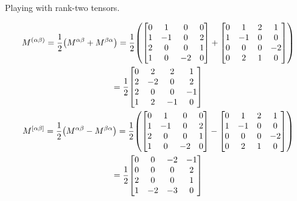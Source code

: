 \documentclass{report}
\begin{document}
\begin{subquests}
\begin{subquests}
		\item	
	\end{subquests}

	\item {Playing with rank-two tensors.}
	\begin{subquests}
		\item
		\begin{subquests}
			\item
			\begin{gather*}
				M^{\pqty{\alpha \beta}} = \frac{1}{2}\pqty{M^{\alpha \beta} + M^{\beta \alpha}} = \frac{1}{2} \pqty{
				\mqty[
					0 & 1 & 0 & 0 \\
					1 & -1 & 0 & 2 \\
					2 & 0 & 0 & 1 \\
					1 & 0 & -2 & 0
				]
				+
				\mqty[
					0 & 1 & 2 & 1 \\
					1 & -1 & 0 & 0 \\
					0 & 0 & 0 & -2 \\
					0 & 2 & 1 & 0 \\
				]} \\
				= \frac{1}{2}
				\mqty[
					0 & 2 & 2 & 1 \\
					2 & -2 & 0 & 2 \\
					2 & 0 & 0 & -1 \\
					1 & 2 & -1 & 0
				] \\
				M^{\bqty{\alpha \beta}} = \frac{1}{2}\pqty{M^{\alpha \beta} - M^{\beta \alpha}} = \frac{1}{2} \pqty{
				\mqty[
					0 & 1 & 0 & 0 \\
					1 & -1 & 0 & 2 \\
					2 & 0 & 0 & 1 \\
					1 & 0 & -2 & 0
				]
				-
				\mqty[
					0 & 1 & 2 & 1 \\
					1 & -1 & 0 & 0 \\
					0 & 0 & 0 & -2 \\
					0 & 2 & 1 & 0 \\
				]} \\
				= \frac{1}{2}
				\mqty[
					0 & 0 & -2 & -1 \\
					0 & 0 & 0 & 2 \\
					2 & 0 & 0 & 1 \\
					1 & -2 & -3 & 0
				]
			\end{gather*}
			

\end{subquests}
\end{subquests}
\end{subquests}
\end{document}
